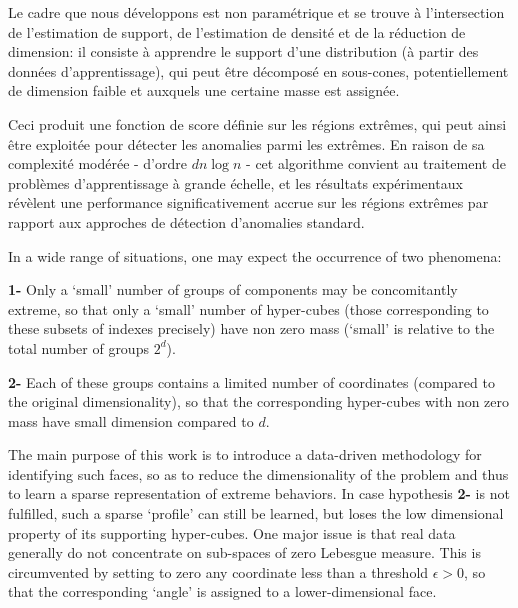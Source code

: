 Le cadre que nous développons est non paramétrique et se trouve à l'intersection de l'estimation de support, de l'estimation de densité et de la réduction de dimension: il consiste à apprendre le support d'une distribution (à partir des données d'apprentissage),  qui peut être décomposé en sous-cones, potentiellement de dimension faible et auxquels une certaine masse est assignée.%

Ceci produit une fonction de score définie sur les régions extrêmes, qui peut ainsi être exploitée pour détecter les anomalies parmi les extrêmes.
En raison de sa complexité modérée - d'ordre $ dn \log n $ - cet algorithme convient au traitement de problèmes d'apprentissage à grande échelle, et les résultats expérimentaux révèlent une performance significativement accrue sur les régions extrêmes par rapport aux approches de détection d'anomalies standard.




In a wide range of situations, one may expect the occurrence of two phenomena:

\textbf{1-} Only a `small' number of groups of components may be concomitantly extreme, so that only a `small' number of hyper-cubes (those corresponding to these subsets of indexes precisely) have non zero mass (`small' is relative to the total number of groups $2^d$).

\textbf{2-} Each of these groups contains a limited number of coordinates (compared to the original dimensionality), so that the corresponding hyper-cubes with non zero mass have small dimension compared to $d$.

The main purpose of this work is to introduce a data-driven methodology for identifying such faces, so as to reduce the
dimensionality of the problem and thus to learn a sparse representation  of extreme behaviors. 
In case hypothesis \textbf{2-} is not fulfilled, such a sparse  `profile' can still be learned, but loses the low dimensional property of its supporting hyper-cubes.
One major issue is that real data generally do not concentrate on sub-spaces of zero Lebesgue measure. This is circumvented by setting to zero any coordinate less than a threshold $\epsilon>0$, so that the corresponding `angle' is assigned to a lower-dimensional face. 

